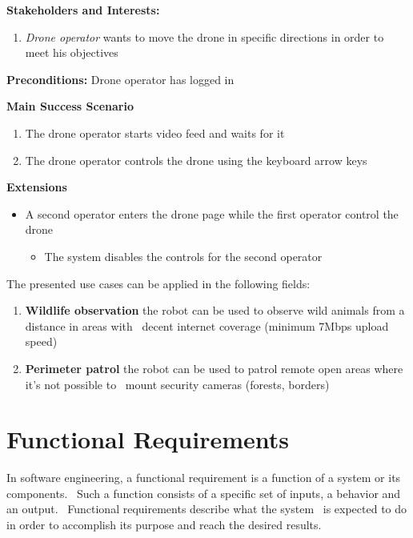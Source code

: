 \textbf{Stakeholders and Interests:}
\begin{enumerate}
    \item \textit{Drone operator} wants to move the drone in specific directions in order to meet his objectives
\end{enumerate}

\textbf{Preconditions:} Drone operator has logged in

\textbf{Main Success Scenario}
\begin{enumerate}
    \item The drone operator starts video feed and waits for it
    \item The drone operator controls the drone using the keyboard arrow keys
\end{enumerate}

\textbf{Extensions}
\begin{itemize}
    \item A second operator enters the drone page while the first operator control the drone
            \begin{itemize}
                \item The system disables the controls for the second operator
            \end{itemize}
\end{itemize}

The presented use cases can be applied in the following fields:
\begin{enumerate}
    \item \textbf{Wildlife observation} the robot can be used to observe wild animals from a distance in areas with \
        decent internet coverage (minimum 7Mbps upload speed)
    \item \textbf{Perimeter patrol} the robot can be used to patrol remote open areas where it's not possible to \
        mount security cameras (forests, borders)
\end{enumerate}


\section{Functional Requirements}
\label{sec:functional-requirements}

In software engineering, a functional requirement is a function of a system or its components. \
Such a function consists of a specific set of inputs, a behavior and an output. \
Functional requirements describe what the system \
is expected to do in order to accomplish its purpose and reach the desired results.


